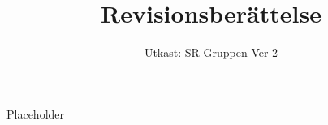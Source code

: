 \documentclass[a4paper]{dtek}
\title{Revisionsberättelse}
\date{Utkast: SR-Gruppen Ver 2}
\begin{document}
Placeholder
\end{document}
